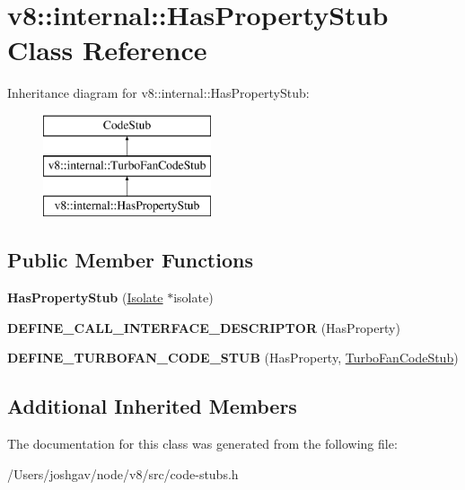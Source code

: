 \hypertarget{classv8_1_1internal_1_1_has_property_stub}{}\section{v8\+:\+:internal\+:\+:Has\+Property\+Stub Class Reference}
\label{classv8_1_1internal_1_1_has_property_stub}
Inheritance diagram for v8\+:\+:internal\+:\+:Has\+Property\+Stub\+:\begin{figure}[H]
\begin{center}
\leavevmode
\includegraphics[height=3.000000cm]{classv8_1_1internal_1_1_has_property_stub}
\end{center}
\end{figure}
\subsection*{Public Member Functions}
\begin{DoxyCompactItemize}
\item 
{\bfseries Has\+Property\+Stub} (\hyperlink{classv8_1_1internal_1_1_isolate}{Isolate} $\ast$isolate)\hypertarget{classv8_1_1internal_1_1_has_property_stub_a02f1b2cc8f8a6c6d2e63487772f37e44}{}\label{classv8_1_1internal_1_1_has_property_stub_a02f1b2cc8f8a6c6d2e63487772f37e44}

\item 
{\bfseries D\+E\+F\+I\+N\+E\+\_\+\+C\+A\+L\+L\+\_\+\+I\+N\+T\+E\+R\+F\+A\+C\+E\+\_\+\+D\+E\+S\+C\+R\+I\+P\+T\+OR} (Has\+Property)\hypertarget{classv8_1_1internal_1_1_has_property_stub_a1ecef46cf914b55d44e7066e59617f8e}{}\label{classv8_1_1internal_1_1_has_property_stub_a1ecef46cf914b55d44e7066e59617f8e}

\item 
{\bfseries D\+E\+F\+I\+N\+E\+\_\+\+T\+U\+R\+B\+O\+F\+A\+N\+\_\+\+C\+O\+D\+E\+\_\+\+S\+T\+UB} (Has\+Property, \hyperlink{classv8_1_1internal_1_1_turbo_fan_code_stub}{Turbo\+Fan\+Code\+Stub})\hypertarget{classv8_1_1internal_1_1_has_property_stub_a16c7121c2b5a34a337fb1878e6f10350}{}\label{classv8_1_1internal_1_1_has_property_stub_a16c7121c2b5a34a337fb1878e6f10350}

\end{DoxyCompactItemize}
\subsection*{Additional Inherited Members}


The documentation for this class was generated from the following file\+:\begin{DoxyCompactItemize}
\item 
/\+Users/joshgav/node/v8/src/code-\/stubs.\+h\end{DoxyCompactItemize}
